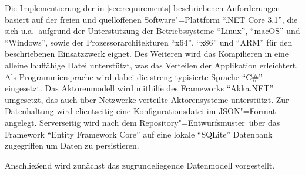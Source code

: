 Die Implementierung der in \autoref{sec:requirements} beschriebenen Anforderungen basiert auf der freien und quelloffenen Software"=Plattform \enquote{.NET Core 3.1}, die sich u.a.\ aufgrund der Unterstützung der Betriebssysteme \enquote{Linux}, \enquote{macOS} und \enquote{Windows}, sowie der Prozessorarchitekturen \enquote{x64}, \enquote{x86} und \enquote{ARM} für den beschriebenen Einsatzzweck eignet.
Des Weiteren wird das Kompilieren in eine alleine lauffähige Datei unterstützt, was das Verteilen der Applikation erleichtert.
Als Programmiersprache wird dabei die streng typisierte Sprache \enquote{C\#} eingesetzt.
Das Aktorenmodell wird mithilfe des Frameworks \enquote{Akka.NET} umgesetzt, das auch über Netzwerke verteilte Aktorensysteme unterstützt.
Zur Datenhaltung wird clientseitig eine Konfigurationsdatei im \ac{JSON}"=Format angelegt.
Serverseitig wird nach dem Repository"=Entwurfsmuster\unskip\ über das Framework \enquote{Entity Framework Core} auf eine lokale \enquote{SQLite} Datenbank zugegriffen um Daten zu persistieren.

Anschließend wird zunächst das zugrundeliegende Datenmodell vorgestellt.
